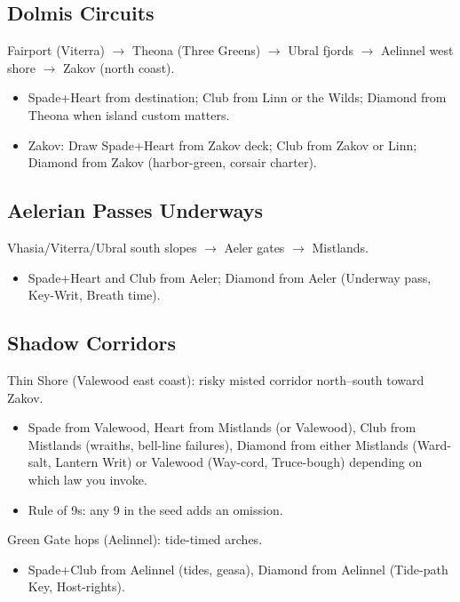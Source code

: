 \subsection{Dolmis Circuits}
Fairport (Viterra) $\rightarrow$ Theona (Three Greens) $\rightarrow$ Ubral fjords $\rightarrow$ Aelinnel west shore $\rightarrow$ Zakov (north coast).

\begin{itemize}
\item Spade+Heart from destination; Club from Linn or the Wilds; Diamond from Theona when island custom matters.
\item Zakov: Draw Spade+Heart from Zakov deck; Club from Zakov or Linn; Diamond from Zakov (harbor-green, corsair charter).
\end{itemize}

\subsection{Aelerian Passes Underways}
Vhasia/Viterra/Ubral south slopes $\rightarrow$ Aeler gates $\rightarrow$ Mistlands.

\begin{itemize}
\item Spade+Heart and Club from Aeler; Diamond from Aeler (Underway pass, Key-Writ, Breath time).
\end{itemize}

\subsection{Shadow Corridors}
Thin Shore (Valewood east coast): risky misted corridor north--south toward Zakov.

\begin{itemize}
\item Spade from Valewood, Heart from Mistlands (or Valewood), Club from Mistlands (wraiths, bell-line failures), Diamond from either Mistlands (Ward-salt, Lantern Writ) or Valewood (Way-cord, Truce-bough) depending on which law you invoke.
\item Rule of 9s: any 9 in the seed adds an omission.
\end{itemize}

Green Gate hops (Aelinnel): tide-timed arches.

\begin{itemize}
\item Spade+Club from Aelinnel (tides, geasa), Diamond from Aelinnel (Tide-path Key, Host-rights).
\end{itemize}

